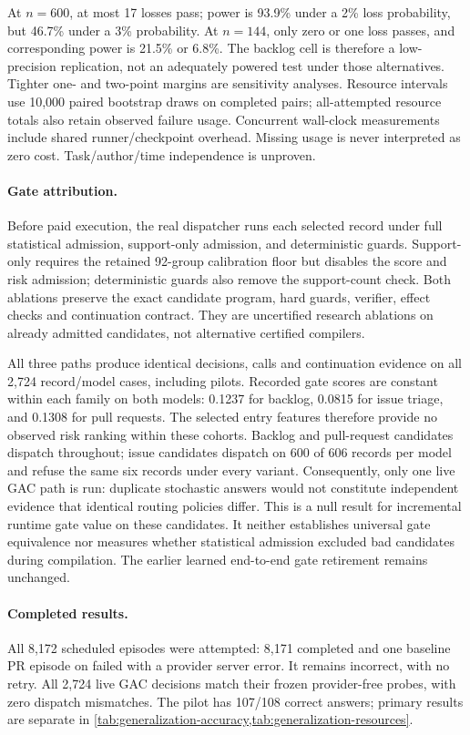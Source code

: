 At $n=600$, at most 17 losses pass; power is 93.9\% under a 2\% loss
probability, but 46.7\% under a 3\% probability. At $n=144$, only zero or one
loss passes, and corresponding power is 21.5\% or 6.8\%. The backlog cell is
therefore a low-precision replication, not an adequately powered test under
those alternatives. Tighter one- and two-point margins are sensitivity analyses.
Resource intervals use 10,000 paired bootstrap draws on completed pairs;
all-attempted resource totals also retain observed failure usage. Concurrent
wall-clock measurements include shared runner/checkpoint overhead. Missing usage
is never interpreted as zero cost. Task/author/time independence is unproven.

\paragraph{Gate attribution.}
Before paid execution, the real dispatcher runs each selected record under
full statistical admission, support-only admission, and deterministic guards.
Support-only requires the retained 92-group calibration floor but disables the
score and risk admission; deterministic guards also remove the support-count
check. Both ablations preserve the exact candidate program, hard guards,
verifier, effect checks and continuation contract. They are uncertified research
ablations on already admitted candidates, not alternative certified compilers.

All three paths produce identical decisions, calls and continuation evidence on
all 2,724 record/model cases, including pilots. Recorded gate scores are constant
within each family on both models: 0.1237 for backlog, 0.0815 for issue triage,
and 0.1308 for pull requests. The selected entry features therefore provide no
observed risk ranking within these cohorts. Backlog and pull-request
candidates dispatch throughout; issue candidates dispatch on 600 of 606 records
per model and refuse the same six records under every variant. Consequently,
only one live GAC path is run: duplicate stochastic answers would not constitute
independent evidence that identical routing policies differ. This is a null
result for incremental runtime gate value on these candidates. It neither
establishes universal gate equivalence nor measures whether statistical admission
excluded bad candidates during compilation. The earlier learned end-to-end gate
retirement remains unchanged.

\paragraph{Completed results.}
All 8,172 scheduled episodes were attempted: 8,171 completed and one baseline
PR episode on  failed with a provider server error. It remains
incorrect, with no retry. All 2,724 live GAC decisions match their frozen
provider-free probes, with zero dispatch mismatches. The pilot has
107/108 correct answers; primary results are separate in
\cref{tab:generalization-accuracy,tab:generalization-resources}.

